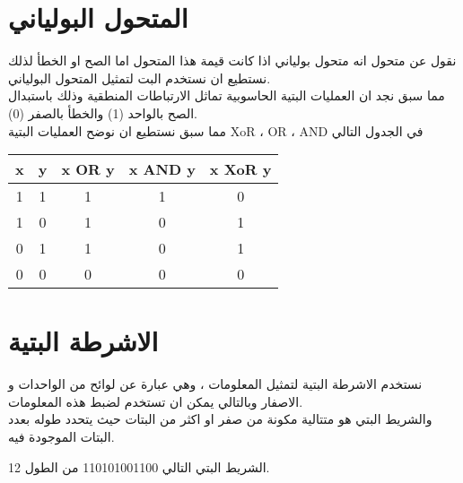 \section{المتحول البولياني}
نقول عن متحول انه متحول بولياني اذا كانت قيمة هذا المتحول اما الصح او الخطأ لذلك نستطيع ان نستخدم البت لتمثيل المتحول البولياني.\\
مما سبق نجد ان العمليات البتية الحاسوبية تماثل الارتباطات المنطقية وذلك باستبدال الصح بالواحد (1) والخطأ بالصفر (0).\\
مما سبق نستطيع ان نوضح العمليات البتية XoR ، OR ، AND  في الجدول التالي

\setLR
\begin{table}[H]
	\centering
		\renewcommand{\arraystretch}{1.4}
		\begin{tabular}{|c|c|c|c|c|}
			\hline
			x & y & x OR y & x AND y& x XoR y \\
			\hline
			1 & 1 & 1 & 1 & 0\\
			1 & 0 & 1 & 0 & 1\\
			0 & 1 & 1 & 0 & 1\\
			0 & 0 & 0 & 0 & 0\\
			\hline
		\end{tabular}
\end{table}
\setRL
\section{الاشرطة البتية}
نستخدم الاشرطة البتية لتمثيل المعلومات ، وهي عبارة عن لوائح من الواحدات و الاصفار وبالتالي يمكن ان تستخدم لضبط هذه المعلومات.\\
والشريط البتي هو متتالية مكونة من صفر او اكثر من البتات حيث يتحدد طوله بعدد البتات الموجودة فيه.

\begin{example}
	الشريط البتي التالي 110101001100 من الطول 12.
\end{example}


